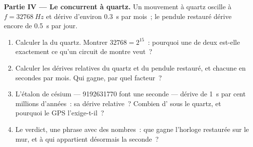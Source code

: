 \begin{problem}
\medskip
\noindent\textbf{Partie IV --- Le concurrent à quartz.} Un mouvement
à quartz oscille à $f = \qty{32768}{Hz}$ et dérive d'environ
\qty{0.3}{s} par mois~; le pendule restauré dérive encore de
\qty{0.5}{s} par jour.
\begin{enumerate}[resume]
  \item Calculer la  du quartz. Montrer
        $\num{32768} = 2^{15}$~: pourquoi une 
        de deux est-elle exactement ce qu'un circuit de montre veut~?
  \item Calculer les dérives relatives du quartz et du pendule
        restauré, et chacune en secondes par mois. Qui gagne, par
        quel facteur~?
  \item L'étalon de césium --- \num{9192631770}
         font une seconde --- dérive de
        \qty{1}{s} par cent millions d'années~: sa dérive relative~?
        Combien d' sous le quartz, et pourquoi le
        GPS l'exige-t-il~?
  \item Le verdict, une phrase avec des nombres~: que gagne l'horloge
        restaurée sur le mur, et à qui appartient désormais la
        seconde~?
\end{enumerate}
\end{problem}
